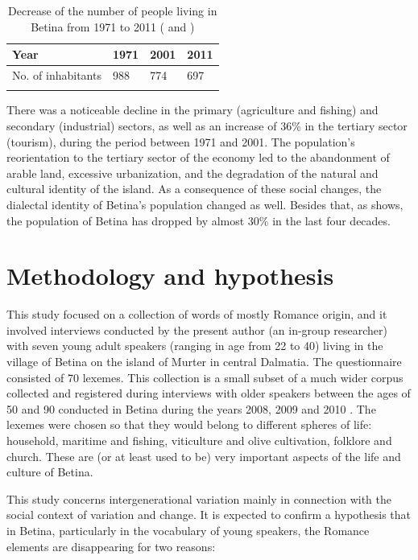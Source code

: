 \documentclass[output=paper]{LSP/langsci}
\begin{document}
\begin{table}
\begin{tabular}{llll}
\lsptoprule
Year & 1971 & 2001 & 2011\\
\midrule
No.  of inhabitants & 988 & 774 & 697\\
\lspbottomrule
\end{tabular}
\caption{Decrease of the number of people living in Betina from 1971 to 2011 (\citealt[15]{skracic_otok_2010} and \citealt{drzavni_zavod_za_statistiku_republike_hrvatske_1})}
\label{tab:2}
\end{table}

There was a noticeable decline in the primary (agriculture and fishing) and secondary (industrial) sectors, as well as an increase of 36\% in the tertiary sector (tourism), during the period between 1971 and 2001. The population’s reorientation to the tertiary sector of the economy led to the abandonment of arable land, excessive urbanization, and the degradation of the natural and cultural identity of the island. As a consequence of these social changes, the dialectal identity of Betina’s population changed as well. Besides that, as  shows, the population of Betina has dropped by almost 30\% in the last four decades.

\section{Methodology and hypothesis}
This study focused on a collection of words of mostly Romance origin, and it involved interviews conducted by the present author (an in-group researcher) with seven young adult speakers (ranging in age from 22 to 40) living in the village of Betina on the island of Murter in central Dalmatia. The questionnaire consisted of 70 lexemes. This collection is a small subset of a much wider corpus collected and registered during interviews with older speakers between the ages of 50 and 90 conducted in Betina during the years 2008, 2009 and 2010 \citep{skevin_etimoloska_2010}. The lexemes were chosen so that they would belong to different spheres of life: household, maritime and fishing, viticulture and olive cultivation, folklore and church. These are (or at least used to be) very important aspects of the life and culture of Betina. 

This study concerns intergenerational variation mainly in connection with the social context of variation and change. It is expected to confirm a hypothesis that in Betina, particularly in the vocabulary of young speakers, the Romance elements are disappearing for two reasons: 
\end{document}
